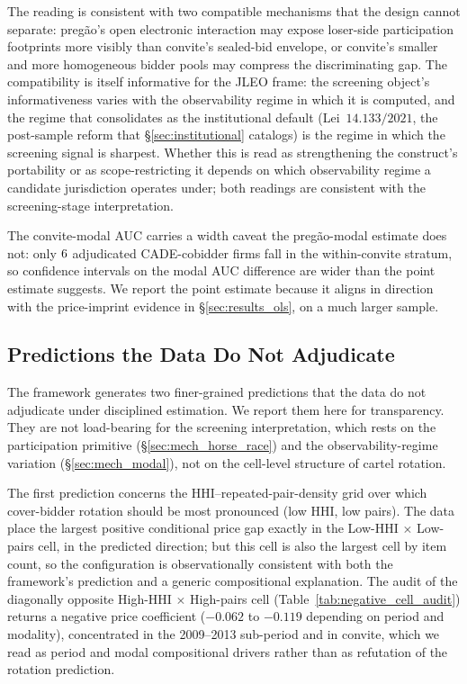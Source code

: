 The reading is consistent with two compatible mechanisms that
the design cannot separate: preg\~ao's open electronic
interaction may expose loser-side participation footprints more
visibly than convite's sealed-bid envelope, or convite's smaller
and more homogeneous bidder pools may compress the discriminating
gap. The compatibility is itself informative for the JLEO frame:
the screening object's informativeness varies with the
observability regime in which it is computed, and the regime
that consolidates as the institutional default
(Lei~$14.133/2021$, the post-sample reform that
\S\ref{sec:institutional} catalogs) is the regime in which the
screening signal is sharpest. Whether this is read as
strengthening the construct's portability or as scope-restricting
it depends on which observability regime a candidate jurisdiction
operates under; both readings are consistent with the
screening-stage interpretation.

The convite-modal AUC carries a width caveat the preg\~ao-modal
estimate does not: only $6$ adjudicated
CADE-cobidder firms fall in the within-convite stratum, so
confidence intervals on the modal AUC difference are wider than
the point estimate suggests. We report the point estimate
because it aligns in direction with the price-imprint evidence
in \S\ref{sec:results_ols}, on a much larger sample.

\subsection{Predictions the Data Do Not Adjudicate}
\label{sec:mech_failed}

The framework generates two finer-grained predictions that the
data do not adjudicate under disciplined estimation. We report
them here for transparency. They are not load-bearing for the
screening interpretation, which rests on the participation
primitive (\S\ref{sec:mech_horse_race}) and the
observability-regime variation (\S\ref{sec:mech_modal}), not on
the cell-level structure of cartel rotation.

The first prediction concerns the
HHI--repeated-pair-density grid over which cover-bidder rotation
should be most pronounced (low HHI, low pairs). The data place
the largest positive conditional price gap exactly in the
Low-HHI $\times$ Low-pairs cell, in the predicted direction; but
this cell is also the largest cell by item count, so the
configuration is observationally consistent with both the
framework's prediction and a generic compositional explanation.
The audit of the diagonally opposite High-HHI $\times$
High-pairs cell (Table~\ref{tab:negative_cell_audit}) returns a
negative price coefficient ($-0.062$ to $-0.119$ depending on
period and modality), concentrated in the 2009--2013 sub-period
and in convite, which we read as period and modal compositional
drivers rather than as refutation of the rotation prediction.

